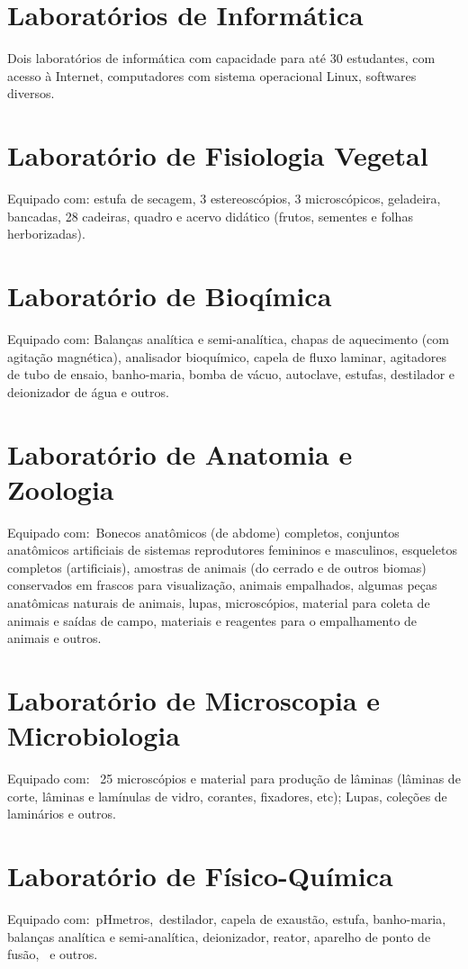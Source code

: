 \documentclass[11pt,fleqn]{book} %
\begin{document}
\section{Laboratórios de Informática}
Dois laboratórios de informática com capacidade para até 30 estudantes, com acesso à Internet, computadores com sistema operacional Linux, softwares diversos.

\section{Laboratório de Fisiologia Vegetal}
Equipado com: estufa de secagem, 3 estereoscópios, 3 microscópicos, geladeira, bancadas, 28 cadeiras, quadro e acervo didático (frutos, sementes e folhas herborizadas). 

\section{Laboratório de Bioqímica}
Equipado com: Balanças analítica e semi-analítica, chapas de aquecimento (com agitação magnética), analisador bioquímico, capela de fluxo laminar, agitadores de tubo de ensaio, banho-maria, bomba de vácuo, autoclave, estufas, destilador e deionizador de água e outros.

\section{Laboratório de Anatomia e Zoologia}
Equipado com: Bonecos anatômicos (de abdome) completos, conjuntos anatômicos artificiais de sistemas reprodutores femininos e masculinos, esqueletos completos (artificiais), amostras de animais (do cerrado e de outros biomas) conservados em frascos para visualização, animais empalhados, algumas peças anatômicas naturais de animais, lupas, microscópios, material para coleta de animais e saídas de campo, materiais e reagentes para o empalhamento de animais e outros.

\section{Laboratório de Microscopia e Microbiologia}
Equipado com:  25 microscópios e material para produção de lâminas (lâminas de corte, lâminas e lamínulas de vidro, corantes, fixadores, etc); Lupas, coleções de laminários e outros.

\section{Laboratório de Físico-Química}
Equipado com: pHmetros, destilador, capela de exaustão, estufa, banho-maria, balanças analítica e semi-analítica, deionizador, reator, aparelho de ponto de fusão,  e outros.
\end{document}
